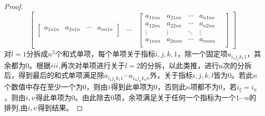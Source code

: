 \documentclass{amsc}          %
\numberwithin{equation}{section} %
\begin{document}
\begin{proof}
$$\begin{bmatrix}
\begin{bmatrix}
  a_{1n1n}& a_{2n1n}&\cdots&a_{nn1n}\\
  \end{bmatrix}&
\cdots&
\begin{bmatrix}
  a_{11nn}& a_{21nn}&\cdots&a_{n1nn}\\
  a_{12nn}& a_{22nn}&\cdots&a_{n2nn}\\
  \vdots&\vdots&\ddots &\vdots& \\
   a_{1nnn}& a_{2nnn}&\cdots&a_{nnnn}\\
\end{bmatrix}
\end{bmatrix}$$
对$l=1$分拆成$n^{3}$个和式单项，每个单项关于指标$i,j,k,1$，除一个固定项$a_{i_{1}j_{1}k_{1}1}$，其余都为0。根据$\uppercase\expandafter{\romannumeral3}$,再次对单项进行关于$l=2$的分拆，以此类推，进行n次的分拆后，得到最后的和式单项满足除$a_{i_{1}j_{1}k_{1}1} \cdots a_{i_{n}j_{n}k_{n}n}$外，关于指标$i,j,k,l$皆为0。若此$n$个数值中存在至少一个为0，则由$\uppercase\expandafter{\romannumeral1}$得到此单项为0，否则此$n$项都不为0，若$i_{\xi}=i_{\eta}$，则由$\uppercase\expandafter{\romannumeral1},\uppercase\expandafter{\romannumeral5}$得此单项为0。由此除去0项，余项满足关于任何一个指标为一个$1 \cdots n$的排列,由$\uppercase\expandafter{\romannumeral1},\uppercase\expandafter{\romannumeral5}$得到结果。
\end{proof}
\end{document}
